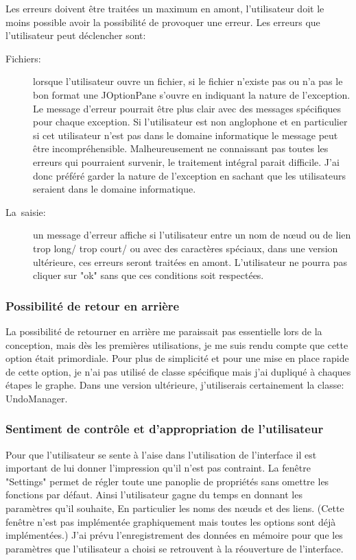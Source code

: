 \documentclass[french]{article}
\begin{document}
    Les erreurs doivent être traitées un maximum en amont, l'utilisateur doit le moins possible avoir la possibilité de provoquer une erreur. Les erreurs que l'utilisateur peut déclencher sont:
    \begin{description}
      \item [{Fichiers: }] lorsque l'utilisateur ouvre un fichier, si le fichier n'existe pas ou n'a pas le bon format une JOptionPane s'ouvre en indiquant la nature de l'exception. Le message d'erreur pourrait être plus clair avec des messages spécifiques pour chaque exception. Si l'utilisateur est non anglophone et en particulier si cet utilisateur n'est pas dans le domaine informatique le message peut être incompréhensible. Malheureusement ne connaissant pas toutes les erreurs qui pourraient survenir, le traitement intégral parait difficile. J'ai donc préféré garder la nature de l'exception en sachant que les utilisateurs seraient dans le domaine informatique.
      \item [{La~saisie: }] un message d'erreur affiche si l'utilisateur entre un nom de nœud ou de lien trop long/ trop court/ ou avec des caractères spéciaux, dans une version ultérieure, ces erreurs seront traitées en amont. L'utilisateur ne pourra pas cliquer sur "ok" sans que ces conditions soit respectées. 
    \end{description}


  \subsubsection{Possibilité de retour en arrière}

    La possibilité de retourner en arrière me paraissait pas essentielle lors de la conception, mais dès les premières utilisations, je me suis rendu compte que cette option était primordiale. Pour plus de simplicité et pour une mise en place rapide de cette option, je n'ai pas utilisé de classe spécifique mais j'ai dupliqué à chaques étapes le graphe. Dans une version ultérieure, j'utiliserais certainement la classe: UndoManager. 

  \subsubsection{Sentiment
  de contrôle et d'appropriation de l'utilisateur}

    Pour que l'utilisateur se sente à l'aise dans l'utilisation de l'interface il est important de lui donner l'impression qu'il n'est pas contraint. La fenêtre "Settings" permet de régler toute une panoplie de propriétés sans omettre les fonctions par défaut. Ainsi l'utilisateur gagne du temps en donnant les paramètres qu'il souhaite, En particulier les noms des nœuds et des liens. (Cette fenêtre n'est pas implémentée graphiquement mais toutes les options sont déjà implémentées.) J'ai prévu l'enregistrement des données en mémoire pour que les paramètres que l'utilisateur a choisi se retrouvent à la réouverture de l'interface.
\end{document}
